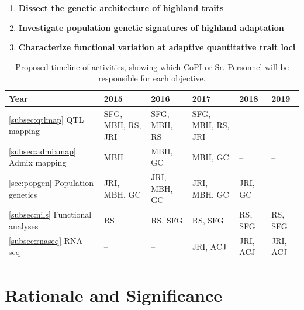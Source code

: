 \begin{enumerate}
\item {\bf Dissect the genetic architecture of highland traits}
\item {\bf Investigate population genetic signatures of highland adaptation}
\item {\bf Characterize functional variation at adaptive quantitative trait loci}
\end{enumerate}

\begin{table}[]
\label{tab:timeline}
\begin{center}
\begin{tabular}{p{3.5cm}p{2cm}p{2cm}p{2cm}p{2cm}p{2cm}}\\\toprule  
    \rowcolor{gray!50}
Year & 2015 & 2016 & 2017 & 2018 & 2019 \\\midrule
\ref{subsec:qtlmap} \hspace{3cm} QTL mapping 			& SFG, MBH, RS, JRI 	& SFG, MBH, RS 	& SFG, MBH, RS, JRI 	& -- 			& -- \\\midrule
\ref{subsec:admixmap} \hspace{3cm} Admix mapping		& MBH 				& MBH, GC 		& MBH, GC 			& -- 			& -- \\\midrule
\ref{sec:popgen} \hspace{3cm} Population genetics		& JRI, MBH, GC 		& JRI, MBH, GC  	& JRI, MBH, GC		& JRI, GC 	& -- \\\midrule
\ref{subsec:nils} \hspace{2cm} Functional \mbox{analyses} 		& RS 				& RS, SFG		& RS, SFG 			& RS, SFG 	& RS, SFG  \\\midrule
\ref{subsec:rnaseq} \hspace{2cm} RNA-seq 				& --  					& --  				& JRI, ACJ  			& JRI, ACJ	& JRI, ACJ \\\bottomrule
\end{tabular}
\caption{Proposed timeline of activities, showing which CoPI or Sr. Personnel will be responsible for each objective. }\label{tab:timeline}
\end{center}
\end{table} 

\section*{Rationale and Significance}

